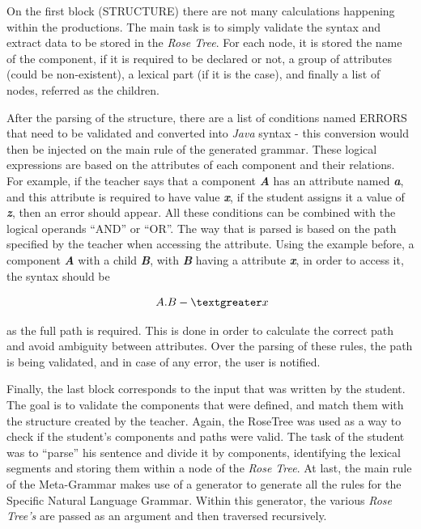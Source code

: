 On the first block (STRUCTURE) there are not many calculations happening within the productions. 
The main task is to simply validate the syntax and extract data to be stored in the \emph{Rose Tree}. 
For each node, it is stored the name of the component, if it is required to be declared or not, a group of attributes (could be non-existent), 
a lexical part (if it is the case), and finally a list of nodes, referred as the children.

After the parsing of the structure, there are a list of conditions named ERRORS that need to be validated and converted into \emph{Java} syntax - this conversion would then be injected on the main rule of the generated grammar. These logical expressions are based on the attributes of each component and their relations. For example, if the teacher says that a component \emph{\textbf{A}} has an attribute named \emph{\textbf{a}}, and this attribute is required to have value \emph{\textbf{x}}, if the student assigns it a value of \emph{\textbf{z}}, then an error should appear. All these conditions can be combined with the logical operands ``AND'' or ``OR''. The way that is parsed is based on the path specified by the teacher when accessing the attribute. Using the example before, a component \emph{\textbf{A}} with a child \emph{\textbf{B}}, with \emph{\textbf{B}} having a attribute \emph{\textbf{x}}, in order to access it, the syntax should be

\[ A.B -\textgreater x \]

\noindent as the full path is required. This is done in order to calculate the correct path and avoid ambiguity between attributes. Over the parsing of these rules, the path is being validated, and in case of any error, the user is notified.

Finally, the last block corresponds to the input that was written by the student. 
The goal is to validate the components that were defined, and match them with the structure created by the teacher. 
Again, the RoseTree was used as a way to check if the student’s components and paths were valid. 
The task of the student was to ``parse'' his sentence and divide it by components, identifying the lexical segments and storing them within a node of the \emph{Rose Tree}. 
At last, the main rule of the Meta-Grammar makes use of a generator to generate all the rules for the Specific Natural Language Grammar. 
Within this generator, the various \emph{Rose Tree's} are passed as an argument and then traversed recursively.


